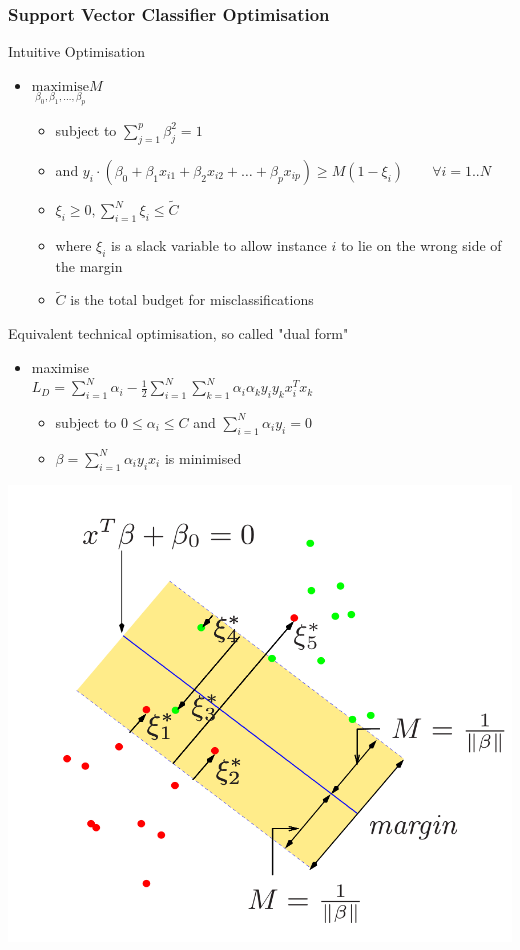 \documentclass[11pt]{article}
\theoremstyle{definition}
\begin{document}
\subsubsection{Support Vector Classifier Optimisation}
\begin{minipage}{0.6\linewidth}
Intuitive Optimisation
\begin{itemize}[noitemsep,nosep]
	\item $\underset{\beta_0,\beta_1,\dots,\beta_p}{\text{maximise}} M$
	\begin{itemize}
		\item subject to $\sum_{j=1}^{p}\beta_j^2 = 1$
		\item and $y_i\cdot (\beta_0 + \beta_1 x_{i1} + \beta_2 x_{i2} + \dots + \beta_p x_{ip}) \geq M(1 - \xi_i)   \qquad\forall i = 1..N$
		\item $\xi_i \geq 0, \sum_{i=1}^{N}\xi_i \leq \tilde{C}$
		\item where $\xi_i$ is a slack variable to allow instance $i$ to lie on the wrong side of the margin
		\item $\tilde{C}$ is the total budget for misclassifications
	\end{itemize}
\end{itemize}
Equivalent technical optimisation, so called "dual form"
\begin{itemize}[noitemsep,nosep]
	\item maximise\\
	$L_D = \sum_{i=1}^{N} \alpha_i - \frac{1}{2} \sum_{i=1}^{N}\sum_{k=1}^{N} \alpha_i \alpha_k y_i y_k x_i^T x_k$
	\begin{itemize}
		\item subject to $0 \leq \alpha_i \leq C$ and $\sum_{i=1}^{N}\alpha_i y_i = 0$
		\item $\beta = \sum_{i=1}^{N} \alpha_i y_i x_i$ is minimised
	\end{itemize}
\end{itemize}
\end{minipage}
\begin{minipage}[t]{0.4\linewidth}
		\centering
		\includegraphics[width=0.8\linewidth]{img/support_vector_classifier_penalty}
\end{minipage}
\end{document}
